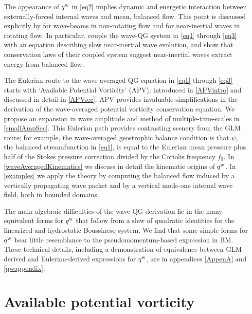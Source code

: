 \documentclass[12pt, oneside]{book}
\begin{document}
The appearance of $q^{\mathrm{w}}$ in \eqref{eq2} implies dynamic and energetic interaction between externally-forced internal waves and mean, balanced flow. This point is discussed explicitly by \cite{KataokaAkylas} for wave-beams in non-rotating flow and \cite{XieVanneste} for near-inertial waves in rotating flow.  In particular, \cite{XieVanneste} couple the wave-QG system in \eqref{eq1} through \eqref{eq3} with an equation describing slow near-inertial wave evolution, and show that conservation laws of their coupled system suggest near-inertial waves extract energy from balanced flow. 

The Eulerian route to the wave-averaged QG equation in \eqref{eq1} through \eqref{eq3} starts with `Available Potential Vorticity' (APV), introduced in \ch \ref{APVintro} and discussed in detail in \ch \ref{APVsec}.  APV provides invaluable simplifications in the derivation of the wave-averaged potential vorticity conservation equation.  We propose an expansion in wave amplitude and method of multiple-time-scales in \ch \ref{smallAmpSec}.  This Eulerian path provides contrasting scenery from the GLM route;  for example, the wave-averaged geostrophic balance condition is that $\psi$, the balanced streamfunction in \eqref{eq1}, is equal to the Eulerian mean pressure plus half of the Stokes pressure correction divided by the Coriolis frequency $f_0$.  In \ch \ref{waveAveragedKinematics} we discuss in detail the kinematic origins of $q^{\mathrm{w}}$.  In \ch \ref{examples} we apply the theory by computing the balanced flow induced by a vertically propagating wave packet and by a vertical  mode-one internal wave field, both in bounded domains.  

The main algebraic difficulties of the wave-QG derivation lie in the many equivalent forms for $q^{\mathrm{w}}$ that follow from a slew of quadratic identities for the linearized and hydrostatic Boussinesq system.  We find that some simple forms for $q^{\mathrm{w}}$ bear little resemblance to the pseudomomentum-based expression in BM.  These technical details, including a demonstration of equivalence between GLM-derived and Eulerian-derived expressions for $q^{\mathrm{w}}$, are in appendices \ref{AppenA} and \ref{qwappendix}.
 
\nocite{BuhlerMcIntyre, AndrewsMcIntyre, Holmes2011}

\section{Available potential vorticity \label{APVsec}}
\end{document}
